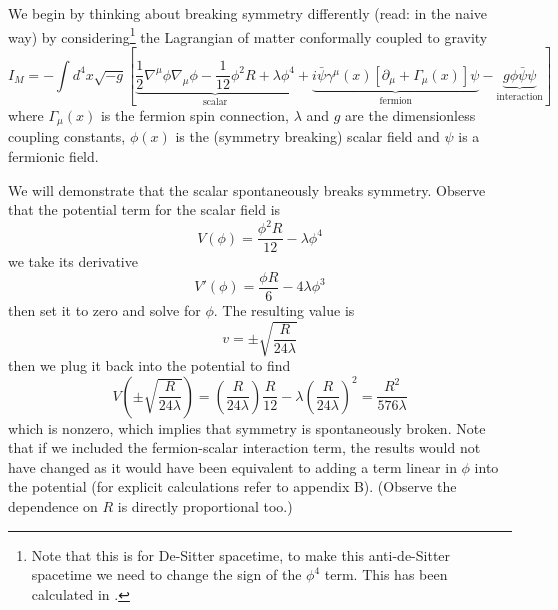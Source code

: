 
We begin by thinking about breaking symmetry differently (read:
in the naive way) by considering\footnote{Note that this is for
  De-Sitter spacetime, to make this anti-de-Sitter spacetime we
  need to change the sign of the $\phi^{4}$ term. This has been
  calculated in \cite{Edery:2006hg}.} the Lagrangian of matter
  conformally coupled to gravity~\cite{Mannheim:1999nc,Mannheim:2007ki} 
\begin{equation}\label{symmetryBreakingAction}
I_{M} = -\int
d^{4}x\sqrt{-g}\left[\underbrace{\frac{1}{2}\nabla^{\mu}\phi\nabla_{\mu}\phi -
  \frac{1}{12}\phi^{2}R + \lambda \phi^{4}}_{\text{scalar}} +
  \underbrace{i\bar{\psi}\gamma^{\mu}(x)[\partial_{\mu} +
    \Gamma_{\mu}(x)]\psi}_{\text{fermion}} - \underbrace{g\phi\bar{\psi}\psi}_{\text{interaction}}\right]
\end{equation}
where $\Gamma_{\mu}(x)$ is the fermion spin connection, $\lambda$ and
$g$ are the dimensionless coupling constants, $\phi(x)$ is the (symmetry
breaking) scalar field and $\psi$ is a fermionic field. 

We will demonstrate that the scalar spontaneously breaks
symmetry. Observe that the potential term for the scalar field is 
\begin{equation}
V(\phi) = \frac{\phi^{2}R}{12} - \lambda\phi^{4}
\end{equation}
we take its derivative 
\begin{equation}
V'(\phi) = \frac{\phi R}{6} - 4\lambda\phi^3
\end{equation}
then set it to zero and solve for $\phi$. The resulting value is
\begin{equation}
v = \pm\sqrt{\frac{R}{24\lambda}}
\end{equation}
then we plug it back into the potential to find
\begin{equation}
V\left(\pm\sqrt{\frac{R}{24\lambda}}\right)
= \left(\frac{R}{24\lambda}\right)\frac{R}{12} - \lambda\left(\frac{R}{24\lambda}\right)^{2} = \frac{R^2}{576\lambda}
\end{equation}
which is nonzero, which implies that symmetry is spontaneously
broken. Note that if we included the fermion-scalar interaction term,
the results would not have changed as it would have been equivalent to
adding a term linear in $\phi$ into the potential (for explicit
calculations refer to appendix B). (Observe the dependence on $R$ is
directly proportional too.)

